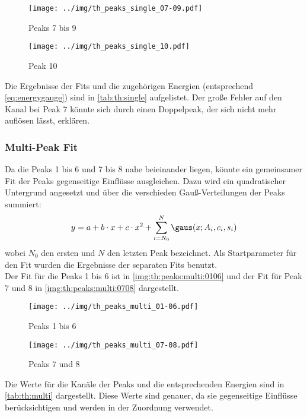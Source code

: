 \begin{figure}[H]
\begin{center}
  \texttt{[image: ../img/th\_peaks\_single\_07-09.pdf]}
  \caption{Peaks 7 bis 9}
  \label{img:th:peaks:single:0709}
\end{center}
\end{figure}

\begin{figure}[H]
\begin{center}
  \texttt{[image: ../img/th\_peaks\_single\_10.pdf]}
  \caption{Peak 10}
  \label{img:th:peaks:single:10}
\end{center}
\end{figure}

Die Ergebnisse der Fits und die zugehörigen Energien (entsprechend \autoref{eq:energygauge}) sind in \autoref{tab:th:single} aufgelistet.
Der große Fehler auf den Kanal bei Peak 7 könnte sich durch einen Doppelpeak, der sich nicht mehr auflösen lässt, erklären.


\subsubsection{Multi-Peak Fit} %
Da die Peaks 1 bis 6 und 7 bis 8 nahe beieinander liegen, könnte ein gemeinsamer Fit der Peaks gegenseitige Einflüsse ausgleichen.
Dazu wird ein quadratischer Untergrund angesetzt und über die verschieden Gauß-Verteilungen der Peaks summiert:
\begin{equation}
  y = a + b\cdot x + c\cdot x^2 + \sum_{i=N_0}^{N} \gaus(x; A_i, c_i, s_i)
\end{equation}
wobei $N_0$ den ersten und $N$ den letzten Peak bezeichnet. Als Startparameter für den Fit wurden die Ergebnisse der separaten Fits benutzt.\\
Der Fit für die Peaks 1 bis 6 ist in \autoref{img:th:peaks:multi:0106} und der Fit für Peak 7 und 8 in 
\autoref{img:th:peaks:multi:0708} dargestellt.
\begin{figure}[H]
\begin{center}
  \texttt{[image: ../img/th\_peaks\_multi\_01-06.pdf]}
  \caption{Peaks 1 bis 6}
  \label{img:th:peaks:multi:0106}
\end{center}
\end{figure}

\begin{figure}[H]
\begin{center}
  \texttt{[image: ../img/th\_peaks\_multi\_07-08.pdf]}
  \caption{Peaks 7 und 8}
  \label{img:th:peaks:multi:0708}
\end{center}
\end{figure}
Die Werte für die Kanäle der Peaks und die entsprechenden Energien sind in \autoref{tab:th:multi} dargestellt. Diese Werte sind genauer, da sie 
gegenseitige Einflüsse berücksichtigen und werden in der Zuordnung verwendet.


